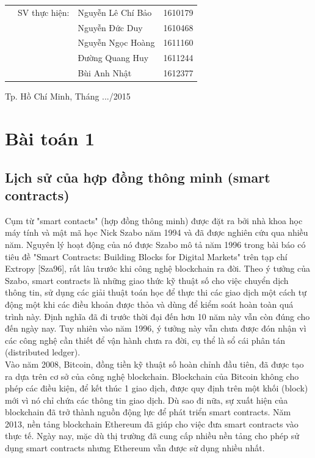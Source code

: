 \documentclass[a4paper]{article}
\begin{document}
\begin{titlepage}
\begin{table}[h]
\begin{tabular}{rrlr}
& SV thực hiện: & Nguyễn Lê Chí Bảo & 1610179 \\
& & Nguyễn Đức Duy & 1610468 \\
& & Nguyễn Ngọc Hoàng & 1611160 \\
& & Đường Quang Huy & 1611244 \\
& & Bùi Anh Nhật & 1612377 \\
\end{tabular}
\end{table}
\vspace{1.2cm}
\begin{center}
{\footnotesize Tp. Hồ Chí Minh, Tháng .../2015}
\end{center}
\end{titlepage}



\newpage
\tableofcontents
\newpage



\section{Bài toán 1}
\subsection{Lịch sử của hợp đồng thông minh (smart contracts)}
Cụm từ "smart contacts" (hợp đồng thông minh) được đặt ra bởi nhà khoa học máy tính và mật mã học Nick Szabo năm 1994 và đã được nghiên cứu qua nhiều năm. Nguyên lý hoạt động của nó được Szabo mô tả năm 1996 trong bài báo có tiêu đề "Smart Contracts: Building Blocks for Digital Markets" trên tạp chí Extropy [Sza96], rất lâu trước khi công nghệ blockchain ra đời. Theo ý tưởng của Szabo, smart contracts là những giao thức kỹ thuật số cho việc chuyển dịch thông tin, sử dụng các giải thuật toán học để thực thi các giao dịch một cách tự động một khi các điều khoản được thỏa và dùng để kiểm soát hoàn toàn quá trình này. Định nghĩa đã đi trước thời đại đến hơn 10 năm này vẫn còn đúng cho đến ngày nay. Tuy nhiên vào năm 1996, ý tưởng này vẫn chưa được đón nhận vì các công nghệ cần thiết để vận hành chưa ra đời, cụ thể là sổ cái phân tán (distributed ledger). \\

Vào năm 2008, Bitcoin, đồng tiền kỹ thuật số hoàn chỉnh đầu tiên, đã được tạo ra dựa trên cơ sở của công nghệ blockchain. Blockchain của Bitcoin không cho phép các điều kiện, để kết thúc 1 giao dịch, được quy định trên một khối (block) mới vì nó chỉ chứa các thông tin giao dịch. Dù sao đi nữa, sự xuất hiện của blockchain đã trở thành nguồn động lực để phát triển smart contracts. Năm 2013, nền tảng blockchain Ethereum đã giúp cho việc đưa smart contracts vào thực tế. Ngày nay, mặc dù thị trường đã cung cấp nhiều nền tảng cho phép sử dụng smart contracts nhưng Ethereum vẫn được sử dụng nhiều nhất. 
\end{document}
